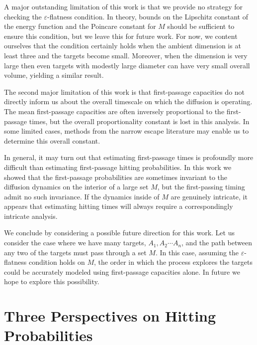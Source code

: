 \documentclass[12pt, nofootinbib,english, amsmath, amssymb, aps, priprint, graphicx,floatfix,draft]{revtex4-1}
\theoremstyle{plain}
\theoremstyle{definition}
\theoremstyle{plain}
\begin{document}
A major outstanding limitation of this work is that we provide no strategy for checking the $\varepsilon$-flatness condition.  In theory, bounds on the Lipschitz constant of the energy function and the Poincare constant for $M$ should be sufficient to ensure this condition, but we leave this for future work.  For now, we content ourselves that the condition certainly holds when the ambient dimension is at least three and the targets become small.  Moreover, when the dimension is very large then even targets with modestly large diameter can have very small overall volume, yielding a similar result.

The second major limitation of this work is that first-passage capacities do not directly inform us about the overall timescale on which the diffusion is operating.  The mean first-passage capacities are often inversely proportional to the first-passage times, but the overall proportionality constant is lost in this analysis.  In some limited cases, methods from the narrow escape literature may enable us to determine this overall constant.

In general, it may turn out that estimating first-passage times is profoundly more difficult than estimating first-passage hitting probabilities.  In this work we showed that the first-passage probabilities are sometimes invariant to the diffusion dynamics on the interior of a large set $M$, but the first-passing timing admit no such invariance.   If the dynamics inside of $M$ are genuinely intricate, it appears that estimating hitting times will always require a correspondingly intricate analysis.

We conclude by considering a possible future direction for this work.  Let us consider the case where we have many targets, $A_1,A_2\cdots A_n$, and the path between any two of the targets must pass through a set $M$.  In this case, assuming the $\varepsilon$-flatness condition holds on $M$, the order in which the process explores the targets could be accurately modeled using first-passage capacities alone.  In future we hope to explore this possibility.

\newpage
\appendix
{}



\section{Three Perspectives on Hitting Probabilities}
\label{sec:three_perspectives}
\end{document}
